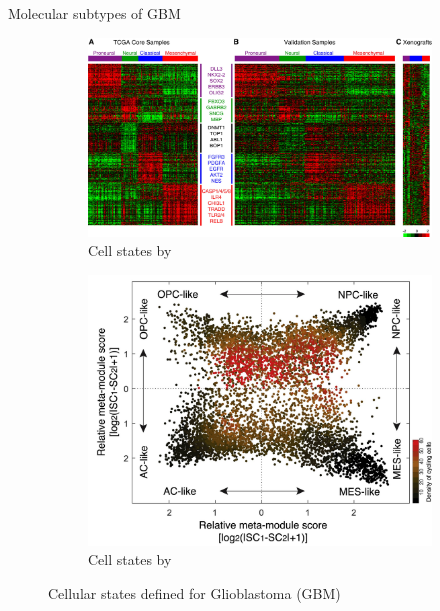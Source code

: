 \documentclass[aspectratio=169,9pt]{beamer}
\begin{document}
    \begin{frame}{Molecular subtypes of GBM}
        \begin{adjustwidth}{-5cm}{-5cm}
            \centering
            \begin{figure}
                \centering
                \begin{subfigure}{0.6\textwidth}
                    \centering
                    \includegraphics[width=\textwidth]{verhaak_clusters}
                    \caption{Cell states by \cite{Verhaak}}
                \end{subfigure}
                \pause
                \begin{subfigure}{0.4\textwidth}
                    \centering
                    \includegraphics[width=\textwidth]{neftel_ninja_star}
                    \caption{Cell states by \cite{Neftel}}
                \end{subfigure}
                \pause[1]\caption{Cellular states defined for Glioblastoma (GBM)}
            \end{figure}
        \end{adjustwidth}
    \end{frame}
\end{document}
